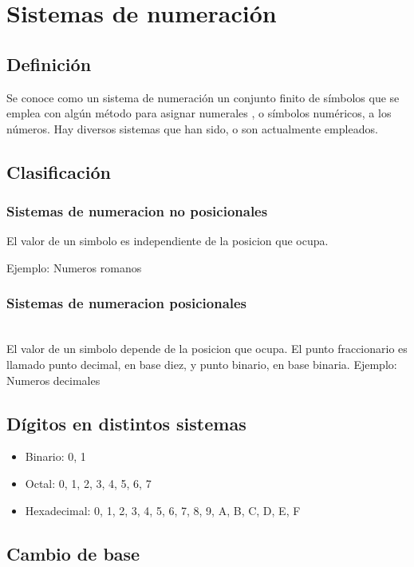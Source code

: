 \section{Sistemas de numeración}

\subsection{Definición}

Se conoce como un sistema de numeración un conjunto finito de símbolos que se emplea con algún método para asignar numerales , o símbolos numéricos, a los números. Hay diversos sistemas que han sido, o son actualmente empleados. 

\subsection{Clasificación}

\subsubsection{Sistemas de numeracion no posicionales}
El valor de un simbolo es independiente de la posicion que ocupa.

Ejemplo: Numeros romanos

\subsubsection{Sistemas de numeracion posicionales}\mbox{}\\
 El valor de un simbolo depende de la posicion que ocupa.
 El punto fraccionario es llamado punto decimal, en base diez, y punto binario, en base binaria.
 Ejemplo: Numeros decimales
 
\subsection{Dígitos en distintos sistemas}
\begin{itemize}
	\item Binario: 0, 1
	\item Octal: 0, 1, 2, 3, 4, 5, 6, 7
	\item Hexadecimal: 0, 1, 2, 3, 4, 5, 6, 7, 8, 9, A, B, C, D, E, F
\end{itemize}
 
\subsection{Cambio de base}
  
